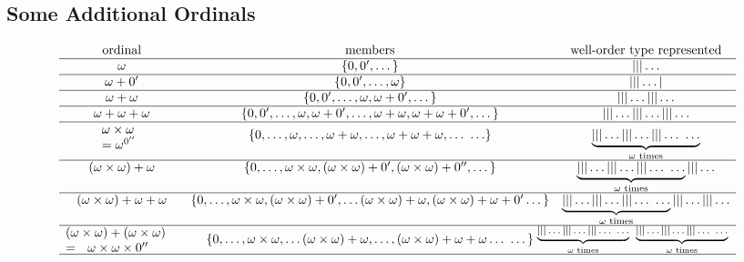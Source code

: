 \documentclass[12pt]{extarticle}
\begin{document}
\begin{landscape}



\section{Some Additional Ordinals}

\[
\begin{array}{ccc}
\text{ordinal} & \text{members} & \text{well-order type represented}\\ \hline
\omega  &\set{0,0',\dots} & | | | \dots   \\ \hline
\omega+0'  &\set{0,0',\dots,\omega} & | | |  \dots  |  \\ \hline
\omega+\omega  &\set{0,0',\dots,\omega, \omega+0',\dots} & | | |  \dots  | | | \dots  \\ \hline
\omega+\omega+\omega  &\set{0,0',\dots,\omega, \omega+0',\dots,\omega+\omega,\omega+\omega+0',\dots} & | | |  \dots  | | | \dots | | | \dots \\ \hline
%
\parbox{11mm}{\vspace{1mm}$\omega\times\omega \\  =  \omega^{0''}$}  &\set{0,\dots,\omega,\dots,\omega+\omega,\dots,\omega+\omega+\omega,\dots \ {\LARGE\dots}} & \underbrace{| | |  \dots  | | | \dots | | | \dots \ {\Large \dots}}_{\omega \text{ times}} \\ \hline
%
(\omega\times\omega)+\omega  &\set{0,\dots,\omega\times\omega,(\omega\times\omega)+0', (\omega\times\omega)+0'', \dots} & \underbrace{| | |  \dots  | | | \dots | | | \dots \ {\Large \dots}}_{\omega \text{ times}} | | | \dots \\ \hline
%
(\omega\times\omega)+\omega+\omega  &\set{0,\dots,\omega\times\omega,(\omega\times\omega)+0', \dots (\omega\times\omega)+\omega, (\omega\times\omega)+\omega + 0' \dots} & \underbrace{| | |  \dots  | | | \dots | | | \dots \ {\Large \dots}}_{\omega \text{ times}} | | | \dots | | | \dots\\ \hline
%
\parbox{31mm}{$(\omega\times\omega)+(\omega\times\omega) \\ \ = \ \  \omega \times \omega \times 0''$} &\set{0,\dots,\omega\times\omega, \dots (\omega\times\omega)+\omega, \dots, (\omega \times \omega) + \omega + \omega \dots \ \dots} & \hspace{-30mm}\parbox{30mm}{\footnotesize $\underbrace{| | |  \dots  | | | \dots | | | \dots \ {\dots}}_{\omega \text{ times}} \ \ \underbrace{| | |  \dots  | | | \dots | | | \dots \ {\dots}}_{\omega \text{ times}}$}\\ \hline

\end{array}\]
\end{landscape}
\end{document}
